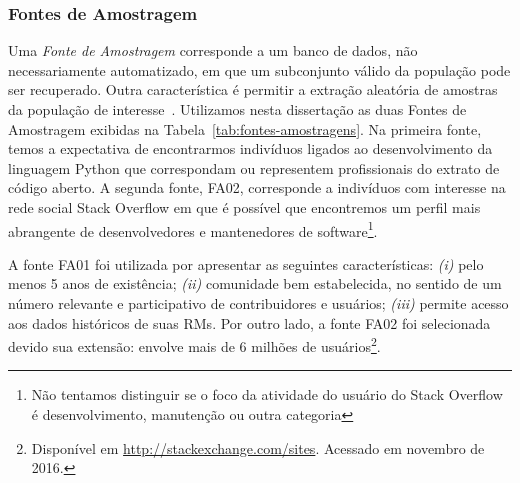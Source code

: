 \subsubsection{Fontes de Amostragem}\label{subsubsec:fontes_amostragem}

Uma \textit{Fonte de Amostragem} corresponde a um banco de dados, não
necessariamente automatizado, em que um subconjunto válido da população pode ser
recuperado. Outra característica é permitir a extração aleatória de amostras da
população de interesse~\cite{de2014towards}. Utilizamos nesta dissertação as
duas Fontes de Amostragem exibidas na Tabela~\ref{tab:fontes-amostragens}. Na
primeira fonte, temos a expectativa de encontrarmos indivíduos ligados ao
desenvolvimento da linguagem Python que correspondam ou representem
profissionais do extrato de código aberto. A segunda fonte, FA02, corresponde a
indivíduos com interesse na rede social Stack Overflow em que é possível que
encontremos um perfil mais abrangente de desenvolvedores e mantenedores de
software\footnote{Não tentamos distinguir se o foco da atividade do usuário do
    Stack Overflow é desenvolvimento, manutenção ou outra categoria}.

\begin{table}[htpb]
\centering
{}
\caption{Fontes de Amostragem utilizadas no estudo}\label{tab:fontes-amostragens}
\end{table}

A fonte FA01 foi utilizada por apresentar as seguintes características:
\textit{(i)} pelo menos 5 anos de existência; \textit{(ii)} comunidade bem
estabelecida, no sentido de um número relevante e participativo de
contribuidores e usuários; \textit{(iii)} permite acesso aos dados históricos de
suas RMs. Por outro lado, a fonte FA02 foi selecionada devido sua extensão:
envolve mais de 6 milhões de usuários\footnote{Disponível em
    \url{http://stackexchange.com/sites}. Acessado em novembro de 2016.}.

